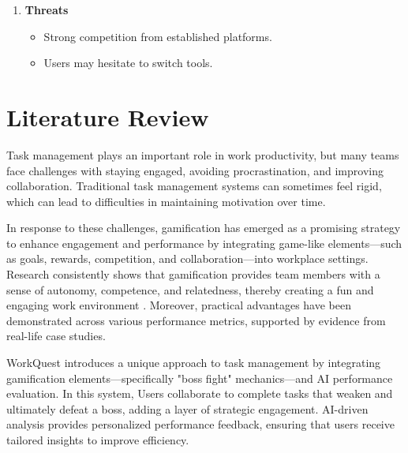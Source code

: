 \begin{enumerate}
\begin{enumerate}
        \item \textbf{Threats}
        \begin{itemize}
            \item Strong competition from established platforms.
            \item Users may hesitate to switch tools.
        \end{itemize}
    \end{enumerate}

\end{enumerate}



\section{Literature Review}
\label{section:literature-review}
    Task management plays an important role in work productivity, but many teams face challenges with staying engaged, avoiding procrastination, and improving collaboration. Traditional task management systems can sometimes feel rigid, which can lead to difficulties in maintaining motivation over time.

    In response to these challenges, gamification has emerged as a promising strategy to enhance engagement and performance by integrating game-like elements—such as goals, rewards, competition, and collaboration—into workplace settings. Research consistently shows that gamification provides team members with a sense of autonomy, competence, and relatedness, thereby creating a fun and engaging work environment \cite{ncbi:pmc10905147}. Moreover, practical advantages have been demonstrated across various performance metrics, supported by evidence from real-life case studies. \cite{Employee:Gamification}

    WorkQuest introduces a unique approach to task management by integrating gamification elements—specifically "boss fight" mechanics—and AI performance evaluation. In this system, Users collaborate to complete tasks that weaken and ultimately defeat a boss, adding a layer of strategic engagement. AI-driven analysis provides personalized performance feedback, ensuring that users receive tailored insights to improve efficiency.

